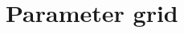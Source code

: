 \documentclass[a4paper, 11pt,notoc]{article}
\begin{document}
\newpage 




%

%

%

%
%

\section{Parameter grid}




 
\end{document}
